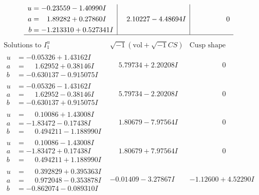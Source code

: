 \documentclass[1p]{elsarticle_modified}
\theoremstyle{definition}
\newcommand{\I}{\sqrt{-1}}
\begin{document}
$$\begin{array}{c|c|c}
\begin{aligned}
u &= -0.23559 - 1.40990 I \\
a &= \phantom{-}1.89282 + 0.27860 I \\
b &= -1.213310 + 0.527341 I\end{aligned}
 & \phantom{-}2.10227 - 4.48694 I & \phantom{-0.000000 } 0\\
 \hline 
 \end{array}$$\newpage$$\begin{array}{c|c|c}  
\text{Solutions to }I^u_{1}& \I (\text{vol} + \sqrt{-1}CS) & \text{Cusp shape}\\
 \hline 
\begin{aligned}
u &= -0.05326 + 1.43162 I \\
a &= \phantom{-}1.62952 + 0.38146 I \\
b &= -0.630137 - 0.915075 I\end{aligned}
 & \phantom{-}5.79734 + 2.20208 I & \phantom{-0.000000 } 0 \\ \hline\begin{aligned}
u &= -0.05326 - 1.43162 I \\
a &= \phantom{-}1.62952 - 0.38146 I \\
b &= -0.630137 + 0.915075 I\end{aligned}
 & \phantom{-}5.79734 - 2.20208 I & \phantom{-0.000000 } 0 \\ \hline\begin{aligned}
u &= \phantom{-}0.10086 + 1.43008 I \\
a &= -1.83472 - 0.17438 I \\
b &= \phantom{-}0.494211 - 1.188990 I\end{aligned}
 & \phantom{-}1.80679 - 7.97564 I & \phantom{-0.000000 } 0 \\ \hline\begin{aligned}
u &= \phantom{-}0.10086 - 1.43008 I \\
a &= -1.83472 + 0.17438 I \\
b &= \phantom{-}0.494211 + 1.188990 I\end{aligned}
 & \phantom{-}1.80679 + 7.97564 I & \phantom{-0.000000 } 0 \\ \hline\begin{aligned}
u &= \phantom{-}0.392829 + 0.395363 I \\
a &= \phantom{-}0.972048 - 0.353878 I \\
b &= -0.862074 - 0.089310 I\end{aligned}
 & -0.01409 - 3.27867 I & -1.12600 + 4.52290 I \\ \hline\begin{aligned}

\end{aligned}
\end{array}$$
\end{document}
